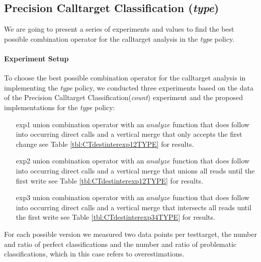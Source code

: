 %
%


\newpage
\subsection{Precision Calltarget Classification (\textit{type})}
\label{subsection:typeshieldprecision}
We are going to present a series of experiments and values to find the best possible combination operator for the calltarget analysis in the \textit{type} policy.
\paragraph{Experiment Setup}
To choose the best possible combination operator for the calltarget analysis in implementing the \textit{type} policy, we conducted three experiments based on the data of the Precision Calltarget Classification(\textit{count}) experiment and the proposed implementations for the \textit{type} policy:
\begin{enumerate}
\item[exp1] union combination operator with an $analyze$ function that does follow into occurring direct calls and a vertical merge that only accepts the first change see Table \ref{tbl:CTdestinterexp12TYPE} for results.
\item[exp2] union combination operator with an $analyze$ function that does follow into occurring direct calls  and a vertical merge that unions all reads until the first write see Table \ref{tbl:CTdestinterexp12TYPE} for results.
\item[exp3] union combination operator with an $analyze$ function that does follow into occurring direct calls  and a vertical merge that intersects all reads until the first write see Table \ref{tbl:CTdestinterexp34TYPE} for results.
\end{enumerate}
For each possible version we measured two data points per testtarget, the number and ratio of perfect classifications and the number and ratio of problematic classifications, which in this case refers to overestimations.
